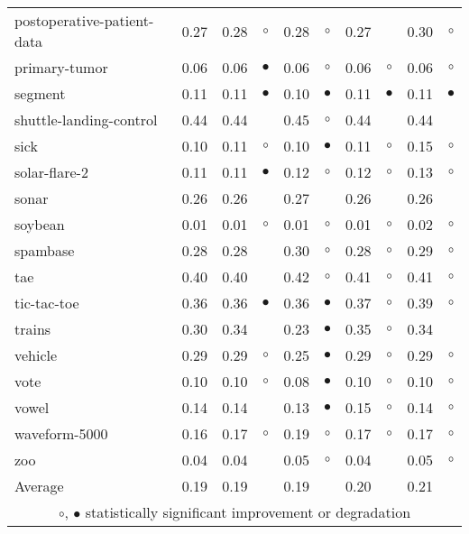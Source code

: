 \begin{table}[thb]
{\begin{tabular}{lrr@{\hspace{0.1cm}}cr@{\hspace{0.1cm}}cr@{\hspace{0.1cm}}cr@{\hspace{0.1cm}}c}
postoperative-patient-data & 0.27 & 0.28 &    $\circ$ & 0.28 &   $\circ$ & 0.27 &           & 0.30 &   $\circ$\\
primary-tumor & 0.06 & 0.06 &  $\bullet$ & 0.06 &   $\circ$ & 0.06 &   $\circ$ & 0.06 &   $\circ$\\
segment & 0.11 & 0.11 &  $\bullet$ & 0.10 & $\bullet$ & 0.11 & $\bullet$ & 0.11 & $\bullet$\\
shuttle-landing-control & 0.44 & 0.44 &            & 0.45 &   $\circ$ & 0.44 &           & 0.44 &          \\
sick & 0.10 & 0.11 &    $\circ$ & 0.10 & $\bullet$ & 0.11 &   $\circ$ & 0.15 &   $\circ$\\
solar-flare-2 & 0.11 & 0.11 &  $\bullet$ & 0.12 &   $\circ$ & 0.12 &   $\circ$ & 0.13 &   $\circ$\\
sonar & 0.26 & 0.26 &            & 0.27 &           & 0.26 &           & 0.26 &          \\
soybean & 0.01 & 0.01 &    $\circ$ & 0.01 &   $\circ$ & 0.01 &   $\circ$ & 0.02 &   $\circ$\\
spambase & 0.28 & 0.28 &            & 0.30 &   $\circ$ & 0.28 &   $\circ$ & 0.29 &   $\circ$\\
tae & 0.40 & 0.40 &            & 0.42 &   $\circ$ & 0.41 &   $\circ$ & 0.41 &   $\circ$\\
tic-tac-toe & 0.36 & 0.36 &  $\bullet$ & 0.36 & $\bullet$ & 0.37 &   $\circ$ & 0.39 &   $\circ$\\
trains & 0.30 & 0.34 &            & 0.23 & $\bullet$ & 0.35 &   $\circ$ & 0.34 &          \\
vehicle & 0.29 & 0.29 &    $\circ$ & 0.25 & $\bullet$ & 0.29 &   $\circ$ & 0.29 &   $\circ$\\
vote & 0.10 & 0.10 &    $\circ$ & 0.08 & $\bullet$ & 0.10 &   $\circ$ & 0.10 &   $\circ$\\
vowel & 0.14 & 0.14 &            & 0.13 & $\bullet$ & 0.15 &   $\circ$ & 0.14 &   $\circ$\\
waveform-5000 & 0.16 & 0.17 &    $\circ$ & 0.19 &   $\circ$ & 0.17 &   $\circ$ & 0.17 &   $\circ$\\
zoo & 0.04 & 0.04 &            & 0.05 &   $\circ$ & 0.04 &           & 0.05 &   $\circ$\\
\hline
Average & 0.19 & 0.19 &            & 0.19 &           & 0.20 &           & 0.21 &          \\
\hline
\multicolumn{10}{c}{$\circ$, $\bullet$ statistically significant improvement or degradation}\\
\end{tabular} \footnotesize \par}
\end{table}